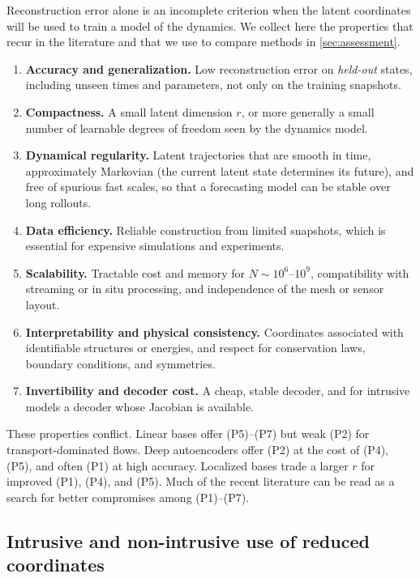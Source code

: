 Reconstruction error alone is an incomplete criterion when the latent
coordinates will be used to train a model of the dynamics. We collect here the
properties that recur in the literature and that we use to compare methods in
\cref{sec:assessment}.
\begin{enumerate}[label=(P\arabic*),leftmargin=3.2em,itemsep=2pt]
  \item \textbf{Accuracy and generalization.} Low reconstruction error on
  \emph{held-out} states, including unseen times and parameters, not only on
  the training snapshots.
  \item \textbf{Compactness.} A small latent dimension $r$, or more generally a
  small number of learnable degrees of freedom seen by the dynamics model.
  \item \textbf{Dynamical regularity.} Latent trajectories that are smooth in
  time, approximately Markovian (the current latent state determines its
  future), and free of spurious fast scales, so that a forecasting model can
  be stable over long rollouts.
  \item \textbf{Data efficiency.} Reliable construction from limited snapshots,
  which is essential for expensive simulations and experiments.
  \item \textbf{Scalability.} Tractable cost and memory for $N\sim10^{6}$--$10^{9}$,
  compatibility with streaming or in situ processing, and independence of the
  mesh or sensor layout.
  \item \textbf{Interpretability and physical consistency.} Coordinates
  associated with identifiable structures or energies, and respect for
  conservation laws, boundary conditions, and symmetries.
  \item \textbf{Invertibility and decoder cost.} A cheap, stable decoder, and
  for intrusive models a decoder whose Jacobian is available.
\end{enumerate}
These properties conflict. Linear bases offer (P5)--(P7) but weak (P2) for
transport-dominated flows. Deep autoencoders offer (P2) at the cost of (P4),
(P5), and often (P1) at high accuracy. Localized bases trade a larger $r$ for
improved (P1), (P4), and (P5). Much of the recent literature can be read as a
search for better compromises among (P1)--(P7).

\subsection{Intrusive and non-intrusive use of reduced coordinates}

